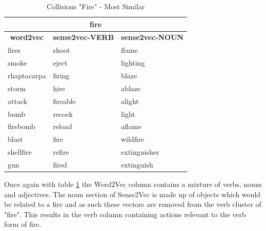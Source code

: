 \begin{table}[h]
\centering
\begin{tabular}{|l|l|l|}
\hline
\multicolumn{3}{|c|}{\textbf{fire}}                                                                                                   \\ \hline
\multicolumn{1}{|c|}{\textbf{word2vec}} & \multicolumn{1}{c|}{\textbf{sense2vec-VERB}} & \multicolumn{1}{c|}{\textbf{sense2vec-NOUN}} \\ \hline
fires                                   & shoot                                        & flame                                        \\ \hline
smoke                                   & eject                                        & lighting                                     \\ \hline
rhaptocarpa                             & firing                                       & blaze                                        \\ \hline
storm                                   & hire                                         & ablaze                                       \\ \hline
attack                                  & fireable                                     & alight                                       \\ \hline
bomb                                    & recock                                       & light                                        \\ \hline
firebomb                                & reload                                       & aflame                                       \\ \hline
blast                                   & fire                                         & wildfire                                     \\ \hline
shellfire                               & refire                                       & extinguisher                                 \\ \hline
gun                                     & fired                                        & extinguish                                   \\ \hline
\end{tabular}
\caption{Collisions "Fire" - Most Similar}
\label{Collisions "Fire" - Most Similar}
\end{table}

\noindent
Once again with table \ref{Collisions "Fire" - Most Similar} the Word2Vec column contains a mixture of verbs, nouns and adjectives. The noun section of Sense2Vec is made up of objects which would be related to a fire and as such these vectors are removed from the verb cluster of "fire". This results in the verb column containing actions relevant to the verb form of fire. 

